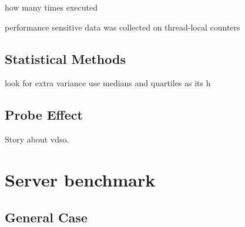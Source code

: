 \documentclass[12pt,a4paper,twoside]{report}
\begin{document}
how many times executed

performance sensitive data was collected on thread-local counters
\subsection{Statistical Methods}

look for extra variance
use medians and quartiles as its h
\subsection{Probe Effect}

Story about vdso.







\section{Server benchmark} 

\subsection{General Case}
\label{section:benchmark-general-case}
\end{document}
